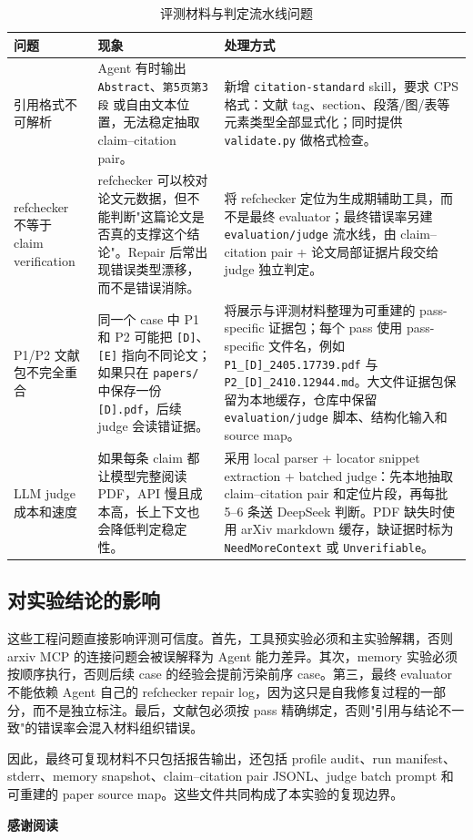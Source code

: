 \documentclass[UTF8,fontset=fandol,a4paper,12pt]{ctexart}
\begin{document}
\begin{table}[htbp]
  \centering
  \small
  \caption{评测材料与判定流水线问题}
  \begin{tabularx}{\textwidth}{@{}p{2.8cm}XX@{}}
    \toprule
    问题 & 现象 & 处理方式 \\
    \midrule
    引用格式不可解析 &
    Agent 有时输出 \texttt{Abstract}、\texttt{第5页第3段} 或自由文本位置，无法稳定抽取 claim--citation pair。 &
    新增 \texttt{citation-standard} skill，要求 CPS 格式：文献 tag、section、段落/图/表等元素类型全部显式化；同时提供 \texttt{validate.py} 做格式检查。 \\
    \addlinespace
    refchecker 不等于 claim verification &
    refchecker 可以校对论文元数据，但不能判断"这篇论文是否真的支撑这个结论"。Repair 后常出现错误类型漂移，而不是错误消除。 &
    将 refchecker 定位为生成期辅助工具，而不是最终 evaluator；最终错误率另建 \texttt{evaluation/judge} 流水线，由 claim--citation pair + 论文局部证据片段交给 judge 独立判定。 \\
    \addlinespace
    P1/P2 文献包不完全重合 &
    同一个 case 中 P1 和 P2 可能把 \texttt{[D]}、\texttt{[E]} 指向不同论文；如果只在 \texttt{papers/} 中保存一份 \texttt{[D].pdf}，后续 judge 会读错证据。 &
    将展示与评测材料整理为可重建的 pass-specific 证据包；每个 pass 使用 pass-specific 文件名，例如 \texttt{P1\_[D]\_2405.17739.pdf} 与 \texttt{P2\_[D]\_2410.12944.md}。大文件证据包保留为本地缓存，仓库中保留 \texttt{evaluation/judge} 脚本、结构化输入和 source map。 \\
    \addlinespace
    LLM judge 成本和速度 &
    如果每条 claim 都让模型完整阅读 PDF，API 慢且成本高，长上下文也会降低判定稳定性。 &
    采用 local parser + locator snippet extraction + batched judge：先本地抽取 claim--citation pair 和定位片段，再每批 5--6 条送 DeepSeek 判断。PDF 缺失时使用 arXiv markdown 缓存，缺证据时标为 \texttt{NeedMoreContext} 或 \texttt{Unverifiable}。 \\
    \bottomrule
  \end{tabularx}
\end{table}

\subsection{对实验结论的影响}

这些工程问题直接影响评测可信度。首先，工具预实验必须和主实验解耦，否则 arxiv MCP 的连接问题会被误解释为 Agent 能力差异。其次，memory 实验必须按顺序执行，否则后续 case 的经验会提前污染前序 case。第三，最终 evaluator 不能依赖 Agent 自己的 refchecker repair log，因为这只是自我修复过程的一部分，而不是独立标注。最后，文献包必须按 pass 精确绑定，否则"引用与结论不一致"的错误率会混入材料组织错误。

因此，最终可复现材料不只包括报告输出，还包括 profile audit、run manifest、stderr、memory snapshot、claim--citation pair JSONL、judge batch prompt 和可重建的 paper source map。这些文件共同构成了本实验的复现边界。

\vspace{1em}
\begin{center}
\large\textbf{感谢阅读}
\end{center}
\end{document}
